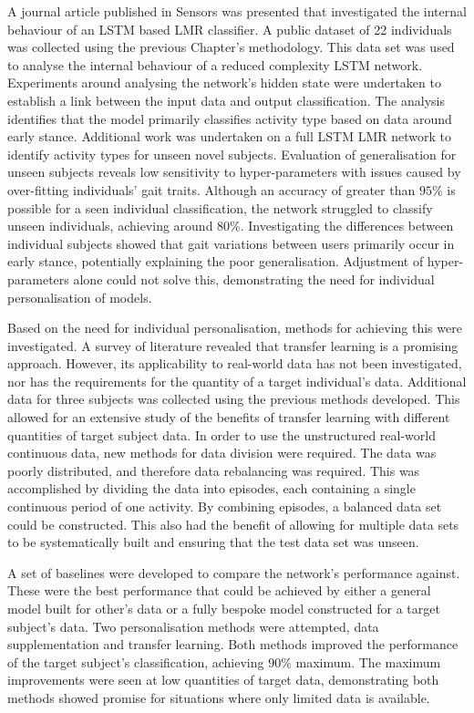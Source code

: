 A journal article published in Sensors was presented that investigated the internal behaviour of an LSTM based LMR classifier. A public dataset of 22 individuals was collected using the previous Chapter's methodology. This data set was used to analyse the internal behaviour of a reduced complexity LSTM network. Experiments around analysing the network's hidden state were undertaken to establish a link between the input data and output classification. The analysis identifies that the model primarily classifies activity type based on data around early stance. Additional work was undertaken on a full LSTM LMR network to identify activity types for unseen novel subjects. Evaluation of generalisation for unseen subjects reveals low sensitivity to hyper-parameters with issues caused by over-fitting individuals' gait traits. Although an accuracy of greater than $95\%$ is possible for a seen individual classification, the network struggled to classify unseen individuals, achieving around $80\%$. Investigating the differences between individual subjects showed that gait variations between users primarily occur in early stance, potentially explaining the poor generalisation. Adjustment of hyper-parameters alone could not solve this, demonstrating the need for individual personalisation of models.

Based on the need for individual personalisation, methods for achieving this were investigated. A survey of literature revealed that transfer learning is a promising approach. However, its applicability to real-world data has not been investigated, nor has the requirements for the quantity of a target individual's data. Additional data for three subjects was collected using the previous methods developed. This allowed for an extensive study of the benefits of transfer learning with different quantities of target subject data. In order to use the unstructured real-world continuous data, new methods for data division were required. The data was poorly distributed, and therefore data rebalancing was required. This was accomplished by dividing the data into episodes, each containing a single continuous period of one activity. By combining episodes, a balanced data set could be constructed. This also had the benefit of allowing for multiple data sets to be systematically built and ensuring that the test data set was unseen.

A set of baselines were developed to compare the network's performance against. These were the best performance that could be achieved by either a general model built for other's data or a fully bespoke model constructed for a target subject's data. Two personalisation methods were attempted, data supplementation and transfer learning. Both methods improved the performance of the target subject's classification, achieving $90\%$ maximum. The maximum improvements were seen at low quantities of target data, demonstrating both methods showed promise for situations where only limited data is available.


